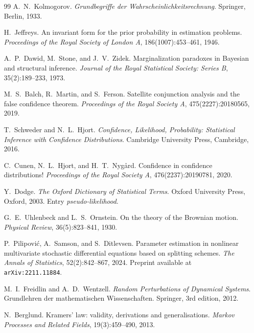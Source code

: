 \documentclass[12pt,a4paper]{article}
\theoremstyle{definition}
\theoremstyle{plain}
\begin{document}
{\begin{thebibliography}{99}
A.~N.~Kolmogorov.
\newblock \emph{Grundbegriffe der Wahrscheinlichkeitsrechnung}.
\newblock Springer, Berlin, 1933.

H.~Jeffreys.
\newblock An invariant form for the prior probability in estimation problems.
\newblock \emph{Proceedings of the Royal Society of London A}, 186(1007):453--461, 1946.

A.~P.~Dawid, M.~Stone, and J.~V.~Zidek.
\newblock Marginalization paradoxes in Bayesian and structural inference.
\newblock \emph{Journal of the Royal Statistical Society: Series B}, 35(2):189--233, 1973.

M.~S.~Balch, R.~Martin, and S.~Ferson.
\newblock Satellite conjunction analysis and the false confidence theorem.
\newblock \emph{Proceedings of the Royal Society A}, 475(2227):20180565, 2019.

T.~Schweder and N.~L.~Hjort.
\newblock \emph{Confidence, Likelihood, Probability: Statistical Inference with Confidence
Distributions}.
\newblock Cambridge University Press, Cambridge, 2016.

C.~Cunen, N.~L.~Hjort, and H.~T.~Nyg{\aa}rd.
\newblock Confidence in confidence distributions!
\newblock \emph{Proceedings of the Royal Society A}, 476(2237):20190781, 2020.

Y.~Dodge.
\newblock \emph{The Oxford Dictionary of Statistical Terms}.
\newblock Oxford University Press, Oxford, 2003.
\newblock Entry \emph{pseudo-likelihood}.

G.~E.~Uhlenbeck and L.~S.~Ornstein.
\newblock On the theory of the Brownian motion.
\newblock \emph{Physical Review}, 36(5):823--841, 1930.

P.~Pilipovi\'c, A.~Samson, and S.~Ditlevsen.
\newblock Parameter estimation in nonlinear multivariate stochastic differential equations
based on splitting schemes.
\newblock \emph{The Annals of Statistics}, 52(2):842--867, 2024.
\newblock Preprint available at \texttt{arXiv:2211.11884}.

M.~I.~Freidlin and A.~D.~Wentzell.
\newblock \emph{Random Perturbations of Dynamical Systems}.
\newblock Grundlehren der mathematischen Wissenschaften. Springer, 3rd edition, 2012.

N.~Berglund.
\newblock Kramers' law: validity, derivations and generalisations.
\newblock \emph{Markov Processes and Related Fields}, 19(3):459--490, 2013.


\end{thebibliography}}
\end{document}
